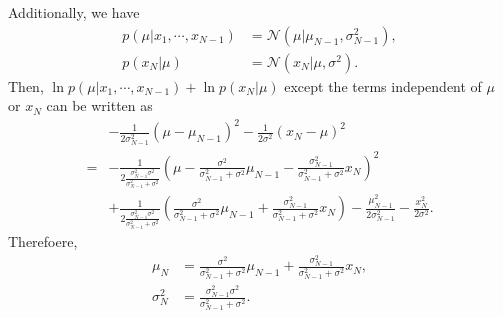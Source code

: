 Additionally, we have
%
\begin{equation}
\begin{aligned}
p(\mu | x_1, \cdots, x_{N - 1})
&=
\mathcal{N}
\left(
	\mu
	|
	\mu_{N - 1},
	\sigma_{N - 1} ^ 2
\right),
\\
p(x_N | \mu)
&=
\mathcal{N}
\left(
	x_N
	|
	\mu,
	\sigma ^ 2
\right).
\end{aligned}
\end{equation}
%
Then, $\ln p(\mu | x_1, \cdots, x_{N - 1}) + \ln p(x_N | \mu)$ except the terms independent of $\mu$ or $x_N$ can be written as
%
\begin{equation}
\begin{aligned}
&-
\frac{1}{2 \sigma_{N - 1} ^ 2}
(\mu - \mu_{N - 1}) ^ 2
-
\frac{1}{2 \sigma ^ 2}
(x_N - \mu) ^ 2
\\
=&
-
\frac
{1}
{2 \frac{\sigma_{N - 1} ^ 2 \sigma ^ 2}{\sigma_{N - 1} ^ 2 + \sigma ^ 2}}
\left(
	\mu
	-
	\frac{\sigma ^ 2}{\sigma_{N - 1} ^ 2 + \sigma ^ 2}
	\mu_{N - 1}
	-
	\frac{\sigma_{N - 1} ^ 2}{\sigma_{N - 1} ^ 2 + \sigma ^ 2}
	x_N
\right) ^ 2
\\
&+
\frac
{1}
{2 \frac{\sigma_{N - 1} ^ 2 \sigma ^ 2}{\sigma_{N - 1} ^ 2 + \sigma ^ 2}}
\left(
	\frac{\sigma ^ 2}{\sigma_{N - 1} ^ 2 + \sigma ^ 2}
	\mu_{N - 1}
	+
	\frac{\sigma_{N - 1} ^ 2}{\sigma_{N - 1} ^ 2 + \sigma ^ 2}
	x_N
\right)
-
\frac{\mu_{N - 1} ^ 2}{2 \sigma_{N - 1} ^ 2}
-
\frac{x_N ^ 2}{2 \sigma ^ 2}.
\end{aligned}
\end{equation}
%
Therefoere,
%
\begin{equation}
\begin{aligned}
\mu_N
&=
\frac{\sigma ^ 2}{\sigma_{N - 1} ^ 2 + \sigma ^ 2}
\mu_{N - 1}
+
\frac{\sigma_{N - 1} ^ 2}{\sigma_{N - 1} ^ 2 + \sigma ^ 2}
x_N,
\\
\sigma_N ^ 2
&=
\frac{\sigma_{N - 1} ^ 2 \sigma ^ 2}{\sigma_{N - 1} ^ 2 + \sigma ^ 2}.
\end{aligned}
\end{equation}
%


